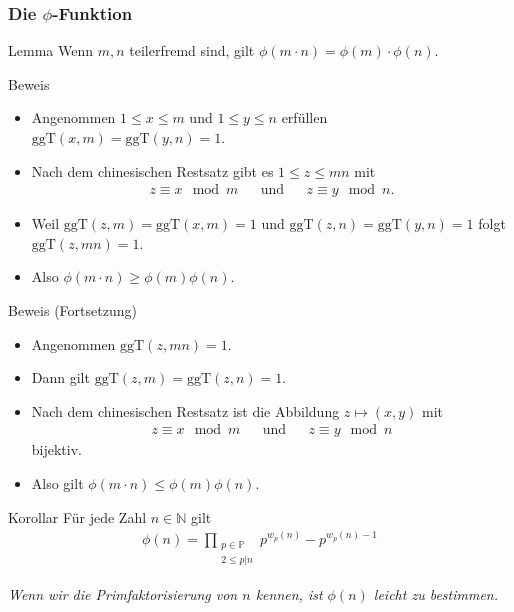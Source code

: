 \documentclass{beamer}
\newcommand\NN{\mathbb N}
\newcommand\PP{\mathbb P}
\newcommand{\ggt}{\mathrm{ggT}}
\newcommand{\ue}{\"u}
\begin{document}
\begin{frame}\frametitle{Die $\phi$-Funktion}
	\begin{block}{Lemma}
		Wenn $m,n$ teilerfremd sind, gilt $\phi(m\cdot n)=\phi(m)\cdot\phi(n)$.
	\end{block}
	\begin{overprint}
		\begin{block}{Beweis}
			\begin{itemize}
				\item Angenommen $1\leq x\leq m$ und $1\leq y\leq n$ erf\ue llen $\ggt(x,m)=\ggt(y,n)=1$.
				\item Nach dem chinesischen Restsatz gibt es $1\leq z\leq mn$ mit
					\begin{align*}
						z\equiv x\mod m&&\mbox{und}&&z\equiv y\mod n.
					\end{align*}
				\item Weil $\ggt(z,m)=\ggt(x,m)=1$ und $\ggt(z,n)=\ggt(y,n)=1$ folgt $\ggt(z,mn)=1$.
				\item Also $\phi(m\cdot n)\geq\phi(m)\phi(n)$.
			\end{itemize}
		\end{block}
		\begin{block}{Beweis (Fortsetzung)}
			\begin{itemize}
				\item Angenommen $\ggt(z,mn)=1$.
				\item Dann gilt $\ggt(z,m)=\ggt(z,n)=1$.
				\item Nach dem chinesischen Restsatz ist die Abbildung $z\mapsto(x,y)$ mit
					\begin{align*}
						z\equiv x\mod m&&\mbox{und}&&z\equiv y\mod n
					\end{align*}
					bijektiv.
				\item Also gilt $\phi(m\cdot n)\leq\phi(m)\phi(n)$.
			\end{itemize}
		\end{block}
		\begin{block}{Korollar}
			F\ue r jede Zahl $n\in\NN$ gilt
			\begin{align*}
				\phi(n)=\prod_{\substack{p\in\PP\\2\leq p|n}}p^{w_p(n)}-p^{w_p(n)-1}
			\end{align*}
		\end{block}
		{\itshape Wenn wir die Primfaktorisierung von $n$ kennen, ist $\phi(n)$ leicht zu bestimmen.}
	\end{overprint}
\end{frame}
\end{document}
